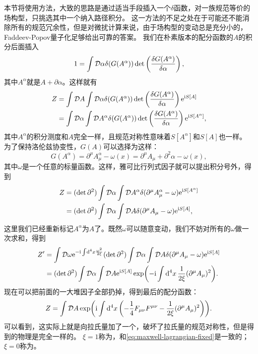 本节将使用方法，大致的思路是通过适当手段插入一个$\delta$函数，对一族规范等价的场构型，只挑选其中一个纳入路径积分。
这一方法的不足之处在于可能还不能消除所有的规范冗余性，但是对微扰计算来说，由于场构型的变动总是充分小的，Faddeev-Popov量子化足够给出可靠的答案。
我们在朴素版本的配分函数的$A$的积分后面插入
\[
    1 = \int \fd{\alpha} \delta(G(A^\alpha)) \det\left( \fdv{G(A^\alpha)}{\alpha} \right),
\]
其中$A^\alpha$就是$A+\partial \alpha$。这样就有
\[
    \begin{aligned}
        Z &= \int \fd{A} \int \fd{\alpha} \delta(G(A^\alpha)) \det\left( \fdv{G(A^\alpha)}{\alpha} \right) \ee^{\ii S[A]} \\
        &= \int \fd{\alpha} \int \fd{A^\alpha} \delta(G(A^\alpha)) \det\left( \fdv{G(A^\alpha)}{\alpha} \right) \ee^{\ii S[A^\alpha]},
    \end{aligned}
\]
其中$A^\alpha$的积分测度和$A$完全一样，且规范对称性意味着$S[A^\alpha]$和$S[A]$也一样。
为了保持洛伦兹协变性，$G(A)$可以选择为这样：
\begin{equation}
    G(A^\alpha) = \partial^\mu A_\mu^\alpha - \omega(x) = \partial^\mu A_\mu + \partial^2 \alpha - \omega(x),
\end{equation}
其中$\omega$是一个任意的标量函数。这样，雅可比行列式因子就可以提出积分号外，得到
\[
    \begin{aligned}
        Z &= (\det \partial^2) \int \mathcal{D} \alpha \int \mathcal{D} A^\alpha \delta(\partial^\mu A_\mu^\alpha - \omega) \mathrm{e}^{\mathrm{i} S[A^\alpha]} \\
        &= (\det \partial^2) \int \mathcal{D} \alpha \int \mathcal{D} A \delta(\partial^\mu A_\mu - \omega)  \mathrm{e}^{\mathrm{i} S[A]},
    \end{aligned}
\]
这里我们已经重新标记$A^\alpha$为$A$了。既然$\omega$可以随意变动，我们不妨对所有的$\omega$做一次求和，得到
\[
    \begin{aligned}
        Z' &= \int \mathcal{D} \omega \mathrm{e}^{-\mathrm{i} \int \dd[4]{x} \frac{\omega^2}{2 \xi}} (\det \partial^2) \int \mathcal{D} \alpha \int \mathcal{D} A \delta(\partial^\mu A_\mu - \omega)  \mathrm{e}^{\mathrm{i} S[A]} \\
        &= (\det \partial^2) \int \mathcal{D} \alpha \int \mathcal{D} A \mathrm{e}^{\mathrm{i} S[A]} \exp(- \mathrm{i} \int \dd[4]{x} \frac{1}{2 \xi} (\partial^\mu A_\mu)^2).
    \end{aligned}
\]
现在可以把前面的一大堆因子全部扔掉，得到最后的配分函数：
\begin{equation}
    Z = \int \mathcal{D} A \exp(\mathrm{i} \int \dd[4]{x} \left( - \frac{1}{4} F_{\mu \nu} F^{\mu \nu} - \frac{1}{2 \xi} (\partial^\mu A_\mu)^2\right)).
\end{equation}
可以看到，这实际上就是向拉氏量加了一个，破坏了拉氏量的规范对称性，但是得到的物理是完全一样的。
$\xi=1$称为，和\eqref{eq:maxwell-lagrangian-fixed}是一致的；$\xi=0$称为。

